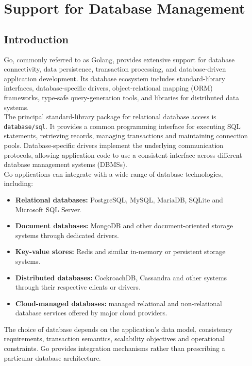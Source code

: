 \section{Support for Database Management}

\subsection{Introduction}

Go, commonly referred to as Golang, provides extensive support for database connectivity, data persistence, transaction processing, and database-driven application development. Its database ecosystem includes standard-library interfaces, database-specific drivers, object-relational mapping (ORM) frameworks, type-safe query-generation tools, and libraries for distributed data systems.\\

The principal standard-library package for relational database access is \texttt{database/sql}. It provides a common programming interface for executing SQL statements, retrieving records, managing transactions and maintaining connection pools. Database-specific drivers implement the underlying communication protocols, allowing application code to use a consistent interface across different database management systems (DBMSs).\\

Go applications can integrate with a wide range of database technologies, including:

\begin{itemize}
    \item \textbf{Relational databases:} PostgreSQL, MySQL, MariaDB, SQLite and Microsoft SQL Server.
    \item \textbf{Document databases:} MongoDB and other document-oriented storage systems through dedicated drivers.
    \item \textbf{Key-value stores:} Redis and similar in-memory or persistent storage systems.
    \item \textbf{Distributed databases:} CockroachDB, Cassandra and other systems through their respective clients or drivers.
    \item \textbf{Cloud-managed databases:} managed relational and non-relational database services offered by major cloud providers.
\end{itemize}

The choice of database depends on the application's data model, consistency requirements, transaction semantics, scalability objectives and operational constraints. Go provides integration mechanisms rather than prescribing a particular database architecture.

